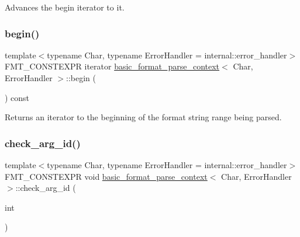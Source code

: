 Advances the begin iterator to {\ttfamily it}. \mbox{\label{classbasic__format__parse__context_a5c45c2385a7aa2a1da7a335f9ac42d9a}} 
\subsubsection{\texorpdfstring{begin()}{begin()}}
{\footnotesize\ttfamily template$<$typename Char, typename Error\+Handler = internal\+::error\+\_\+handler$>$ \\
F\+M\+T\+\_\+\+C\+O\+N\+S\+T\+E\+X\+PR iterator \hyperlink{classbasic__format__parse__context}{basic\+\_\+format\+\_\+parse\+\_\+context}$<$ Char, Error\+Handler $>$\+::begin (\begin{DoxyParamCaption}{ }\end{DoxyParamCaption}) const\hspace{0.3cm}{\ttfamily [inline]}}

Returns an iterator to the beginning of the format string range being parsed. \mbox{\label{classbasic__format__parse__context_a7a548535000cbd315a9ac35996950eec}} 
\subsubsection{\texorpdfstring{check\+\_\+arg\+\_\+id()}{check\_arg\_id()}}
{\footnotesize\ttfamily template$<$typename Char, typename Error\+Handler = internal\+::error\+\_\+handler$>$ \\
F\+M\+T\+\_\+\+C\+O\+N\+S\+T\+E\+X\+PR void \hyperlink{classbasic__format__parse__context}{basic\+\_\+format\+\_\+parse\+\_\+context}$<$ Char, Error\+Handler $>$\+::check\+\_\+arg\+\_\+id (\begin{DoxyParamCaption}\item[{int}]{ }\end{DoxyParamCaption})\hspace{0.3cm}{\ttfamily [inline]}}

